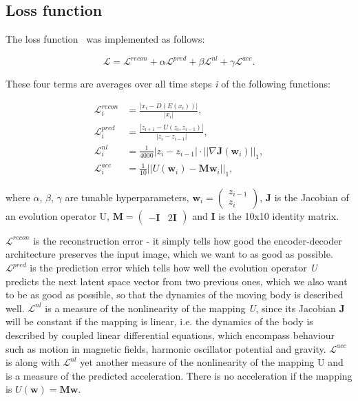 \documentclass[12pt,letterpaper]{article}
\newcommand{\txt}[1]{\textit{#1}}
\newcommand{\nid}{\noindent}
\begin{document}
\subsection{Loss function}
\label{subs:loss_function}

The loss function~\cite{Udrescu2021} was implemented as follows:

\begin{equation*}
    \mathcal{L} = \mathcal{L}^{recon} + \alpha\mathcal{L}^{pred} + \beta\mathcal{L}^{nl} + \gamma\mathcal{L}^{acc}. 
\end{equation*}

\nid These four terms are averages over all time steps \txt{i} of the following functions:

\begin{flushleft}
    \begin{align*}
        \mathcal{L}^{recon}_i & = \frac{|x_i-D(E(x_i))|}{|x_i|},\\
        \mathcal{L}^{pred}_i & = \frac{|z_{i+1} - U(z_i, z_{i-1})|}{|z_i - z_{i-1}|},\\
        \mathcal{L}^{nl}_i & = \frac{1}{4000}|z_i - z_{i-1}|\cdot||\nabla\boldsymbol{J}(\boldsymbol{w}_i)||_1,\\ 
        \mathcal{L}^{acc}_i & = \frac{1}{10}||U(\boldsymbol{w}_i) - \boldsymbol{M}\boldsymbol{w}_i||_1,
    \end{align*}
\end{flushleft}

\nid where $\alpha$, $\beta$, $\gamma$ are tunable hyperparameters, $\mathbf{w}_i = \begin{pmatrix} z_{i-1} \\ z_{i} \end{pmatrix}$, $\boldsymbol{J}$ is the Jacobian of an evolution operator U, $\boldsymbol{M} = \begin{pmatrix} -\boldsymbol{I} & 2\boldsymbol{I} \end{pmatrix}$ and $\boldsymbol{I}$ is the 10x10 identity matrix. 

$\mathcal{L}^{recon}$ is the reconstruction error - it simply tells how good the encoder-decoder architecture preserves the input image, which we want to as good as possible. $\mathcal{L}^{pred}$ is the prediction error which tells how well the evolution operator \txt{U} predicts the next latent space vector from two previous ones, which we also want to be as good as possible, so that the dynamics of the moving body is described well. $\mathcal{L}^{nl}$ is a measure of the nonlinearity of the mapping \txt{U}, since its Jacobian $\boldsymbol{J}$ will be constant if the mapping is linear, i.e. the dynamics of the body is described by coupled linear differential equations, which encompass behaviour such as motion in magnetic fields, harmonic oscillator potential and gravity. $\mathcal{L}^{acc}$ is along with $\mathcal{L}^{nl}$ yet another measure of the nonlinearity of the mapping U and is a measure of the predicted acceleration. There is no acceleration if the mapping is $U(\boldsymbol{w}) = \boldsymbol{M}\boldsymbol{w}$.
\end{document}
